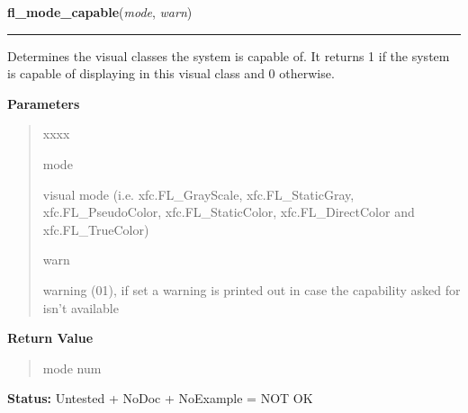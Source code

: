 \hspace{.8\funcindent}\begin{boxedminipage}{\funcwidth}

    \raggedright \textbf{fl\_mode\_capable}(\textit{mode}, \textit{warn})

    \vspace{-1.5ex}

    \rule{\textwidth}{0.5\fboxrule}
\setlength{\parskip}{2ex}
    Determines the visual classes the system is capable of. It returns 1 if
    the system is capable of displaying in this visual class and 0 
    otherwise.

\setlength{\parskip}{1ex}
      \textbf{Parameters}
      \vspace{-1ex}

      \begin{quote}
        \begin{Ventry}{xxxx}

          \item[mode]

          visual mode (i.e. xfc.FL\_GrayScale, xfc.FL\_StaticGray, 
          xfc.FL\_PseudoColor, xfc.FL\_StaticColor, xfc.FL\_DirectColor and
          xfc.FL\_TrueColor)

          \item[warn]

          warning (0{\textbar}1), if set a warning is printed out in case 
          the capability asked for isn't available

        \end{Ventry}

      \end{quote}

      \textbf{Return Value}
    \vspace{-1ex}

      \begin{quote}
      mode num

      \end{quote}

\textbf{Status:} Untested + NoDoc + NoExample = NOT OK



    \end{boxedminipage}

    \label{xformslib:library:fl_default_win}

    \vspace{0.5ex}

